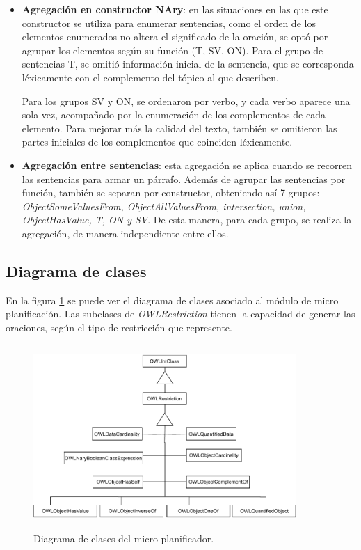 \begin{itemize}
    \item {\bf Agregación en constructor NAry}: en las situaciones en las que este constructor se utiliza para enumerar sentencias, como el orden de los elementos enumerados no altera el significado de la oración, se optó por agrupar los elementos según su función (T, SV, ON). Para el grupo de sentencias T, se omitió información inicial de la sentencia, que se corresponda léxicamente con el complemento del tópico al que describen. 
    
    Para los grupos SV y ON, se ordenaron por verbo, y cada verbo aparece una sola vez, acompañado por la enumeración de los complementos de cada elemento. Para mejorar más la calidad del texto, también se omitieron las partes iniciales de los complementos que coinciden léxicamente.
    
    \item {\bf Agregación entre sentencias}: esta agregación se aplica cuando se recorren las sentencias para armar un párrafo. Además de agrupar las sentencias por función, también se separan por constructor, obteniendo así 7 grupos: \emph{ObjectSomeValuesFrom, ObjectAllValuesFrom, intersection, union, ObjectHasValue, T, ON y SV}. De esta manera, para cada grupo, se realiza la agregación, de manera independiente entre ellos.
\end{itemize}

\subsection{Diagrama de clases}
En la figura \ref{fig:diagrama_clases_microplanificador} se puede ver el diagrama de clases asociado al módulo de micro planificación. Las subclases de \emph{OWLRestriction} tienen la capacidad de generar las oraciones, según el tipo de restricción que represente.

\begin{figure}[H]
    \centering
    \includegraphics[width=10cm, height=7cm]{img/generacion_documento/diagrama_clases_microplanificador.pdf}
    \caption{Diagrama de clases del micro planificador.}
    \label{fig:diagrama_clases_microplanificador}
\end{figure}


